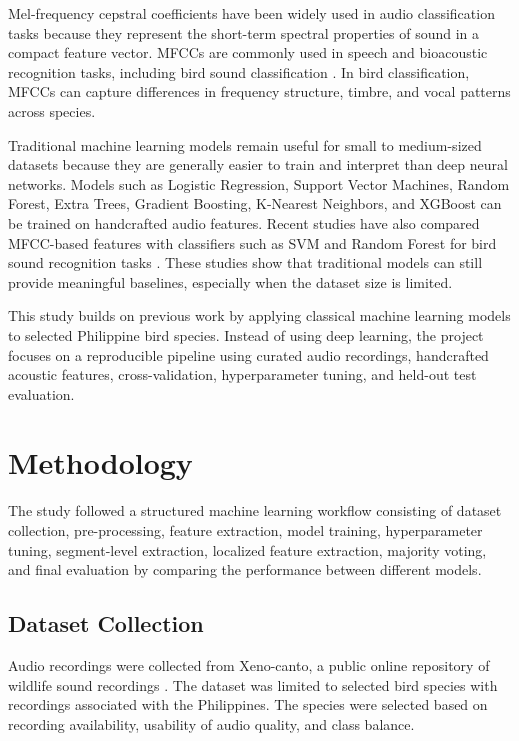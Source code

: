 \documentclass[runningheads]{llncs}
\begin{document}
Mel-frequency cepstral coefficients have been widely used in audio classification tasks because they represent the short-term spectral properties of sound in a compact feature vector. MFCCs are commonly used in speech and bioacoustic recognition tasks, including bird sound classification \cite{librosa_mfcc,fagerlund2007}. In bird classification, MFCCs can capture differences in frequency structure, timbre, and vocal patterns across species.

Traditional machine learning models remain useful for small to medium-sized datasets because they are generally easier to train and interpret than deep neural networks. Models such as Logistic Regression, Support Vector Machines, Random Forest, Extra Trees, Gradient Boosting, K-Nearest Neighbors, and XGBoost can be trained on handcrafted audio features. Recent studies have also compared MFCC-based features with classifiers such as SVM and Random Forest for bird sound recognition tasks \cite{han2023}. These studies show that traditional models can still provide meaningful baselines, especially when the dataset size is limited.

This study builds on previous work by applying classical machine learning models to selected Philippine bird species. Instead of using deep learning, the project focuses on a reproducible pipeline using curated audio recordings, handcrafted acoustic features, cross-validation, hyperparameter tuning, and held-out test evaluation.

\section{Methodology}

The study followed a structured machine learning workflow consisting of dataset collection, pre-processing, feature extraction, model training, hyperparameter tuning, segment-level extraction, localized feature extraction, majority voting, and final evaluation by comparing the performance between different models.

\subsection{Dataset Collection}

Audio recordings were collected from Xeno-canto, a public online repository of wildlife sound recordings \cite{xenocanto}. The dataset was limited to selected bird species with recordings associated with the Philippines. The species were selected based on recording availability, usability of audio quality, and class balance.
\end{document}
